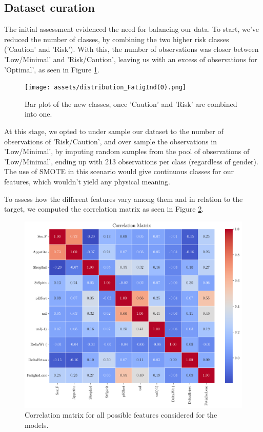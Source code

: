 \documentclass[conference]{IEEEtran}
\begin{document}
\subsection{Dataset curation}

The initial assessment evidenced the need for balancing our data. To start, we've reduced the number of classes, by combining the two higher risk classes ('Caution' and 'Risk'). With this, the number of observations was closer between 'Low/Minimal' and 'Risk/Caution', leaving us with an excess of observations for 'Optimal', as seen in Figure \ref{histClasses}. 

\begin{figure}[H]
    \centering
    \texttt{[image: assets/distribution\_FatigInd(0).png]}
    \caption{Bar plot of the new classes, once 'Caution' and 'Risk' are combined into one.}
    \label{histClasses}
\end{figure}

At this stage, we opted to under sample our dataset to the number of observations of 'Risk/Caution', and over sample the observations in 'Low/Minimal', by imputing random samples from the pool of observations of 'Low/Minimal', ending up with 213 observations per class (regardless of gender). The use of SMOTE in this scenario would give continuous classes for our features, which wouldn't yield any physical meaning.

To assess how the different features vary among them and in relation to the target, we computed the correlation matrix as seen in Figure \ref{fig:correlationMatrix}.

\begin{figure}[H]
    \centering
    \includegraphics[width=1\linewidth]{assets/correlation_matrix.png}
    \caption{Correlation matrix for all possible features considered for the models.}
    \label{fig:correlationMatrix}
\end{figure}
\end{document}
